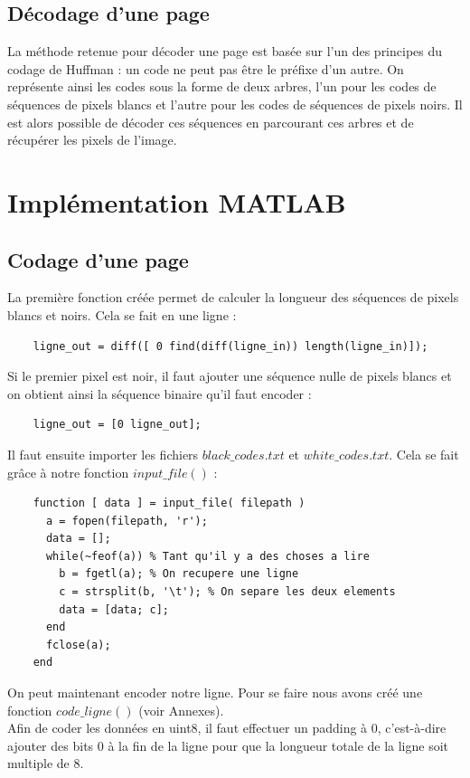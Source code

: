 \documentclass[11pt]{article}
\begin{document}
  \subsection{Décodage d'une page}
  
  La méthode retenue pour décoder une page est basée sur l'un des principes du codage de Huffman : un code ne peut pas être le préfixe d'un autre. On représente ainsi les codes sous la forme de deux arbres, l'un pour les codes de séquences de pixels blancs et l'autre pour les codes de séquences de pixels noirs. Il est alors possible de décoder ces séquences en parcourant ces arbres et de récupérer les pixels de l'image.

\section{Implémentation MATLAB}
  
  \subsection{Codage d'une page}
  
  La première fonction créée permet de calculer la longueur des séquences de pixels blancs et noirs. Cela se fait en une ligne :
  \begin{lstlisting}
  	ligne_out = diff([ 0 find(diff(ligne_in)) length(ligne_in)]);
  \end{lstlisting}

  Si le premier pixel est noir, il faut ajouter une séquence nulle de pixels blancs et on obtient ainsi la séquence binaire qu'il faut encoder :
  \begin{lstlisting}
  	ligne_out = [0 ligne_out];
  \end{lstlisting}
  
  Il faut ensuite importer les fichiers $black\_codes.txt$ et $white\_codes.txt$. Cela se fait grâce à notre fonction $input\_file()$ :
  \begin{lstlisting}
    function [ data ] = input_file( filepath )
      a = fopen(filepath, 'r');
      data = [];
      while(~feof(a)) % Tant qu'il y a des choses a lire
        b = fgetl(a); % On recupere une ligne
        c = strsplit(b, '\t'); % On separe les deux elements
        data = [data; c];
      end
      fclose(a);
    end
  \end{lstlisting}
  
  On peut maintenant encoder notre ligne. Pour se faire nous avons créé une fonction $code\_ligne()$ (voir Annexes).\\
  Afin de coder les données en uint8, il faut effectuer un padding à $0$, c'est-à-dire ajouter des bits $0$ à la fin de la ligne pour que la longueur totale de la ligne soit multiple de 8.
  
\end{document}
